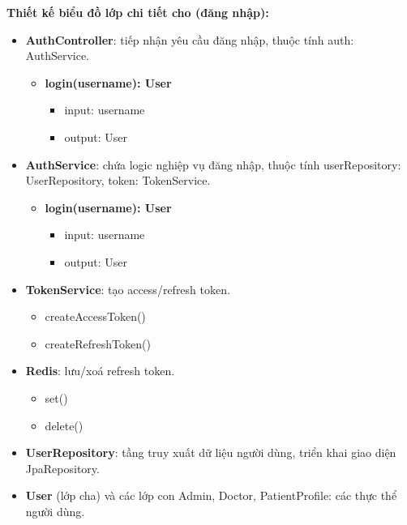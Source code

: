 \textbf{Thiết kế biểu đồ lớp chi tiết cho  (đăng nhập):}
\begin{itemize}[label=\textbullet, itemsep=0.4em]
  \item \textbf{AuthController}: tiếp nhận yêu cầu đăng nhập, thuộc tính auth: AuthService.
  \begin{itemize}[label=$\circ$, itemsep=0.2em, leftmargin=1.5em]
    \item \textbf{login(username): User}
    \begin{itemize}[label=$\blacksquare$, itemsep=0.1em, leftmargin=1.5em]
      \item input: username
      \item output: User
    \end{itemize}
  \end{itemize}
  \item \textbf{AuthService}: chứa logic nghiệp vụ đăng nhập, thuộc tính userRepository: UserRepository, token: TokenService.
  \begin{itemize}[label=$\circ$, itemsep=0.2em, leftmargin=1.5em]
    \item \textbf{login(username): User}
    \begin{itemize}[label=$\blacksquare$, itemsep=0.1em, leftmargin=1.5em]
      \item input: username
      \item output: User
    \end{itemize}
  \end{itemize}
  \item \textbf{TokenService}: tạo access/refresh token.
  \begin{itemize}[label=$\circ$, itemsep=0.2em, leftmargin=1.5em]
    \item createAccessToken()
    \item createRefreshToken()
  \end{itemize}
  \item \textbf{Redis}: lưu/xoá refresh token.
  \begin{itemize}[label=$\circ$, itemsep=0.2em, leftmargin=1.5em]
    \item set()
    \item delete()
  \end{itemize}
  \item \textbf{UserRepository}: tầng truy xuất dữ liệu người dùng, triển khai giao diện JpaRepository.
  \item \textbf{User} (lớp cha) và các lớp con Admin, Doctor, PatientProfile: các thực thể người dùng.
\end{itemize}

